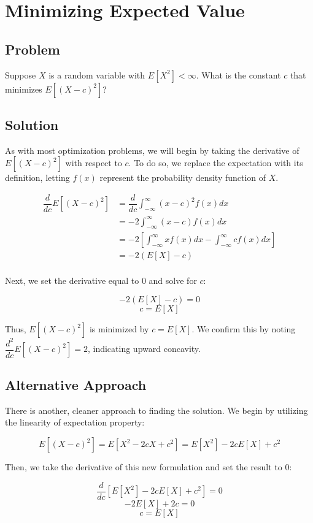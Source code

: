 \documentclass{article}
\date{}
\author{Kaan Aksoy | April 26, 2020}
\title{}
\begin{document}
\maketitle
\section{Minimizing Expected Value}
\subsection{Problem}

Suppose $X$ is a random variable with $E[X^2] < \infty$. What is 
the constant $c$ that minimizes $E[(X - c)^2]$?

\subsection{Solution}

As with most optimization problems, we will begin by taking the 
derivative of $E[(X - c)^2]$ with respect to $c$. To do so, we replace 
the expectation with its definition, letting $f(x)$ represent the 
probability density function of $X$.

\begin{equation*}
\begin{split}
\dfrac{d}{dc}E\left[(X - c)^2\right] &= 
\dfrac{d}{dc} \int_{-\infty}^{\infty} (x-c)^2f(x)dx \\
&= -2\int_{-\infty}^{\infty}(x-c)f(x)dx \\
&= -2\left[ \int_{-\infty}^{\infty}xf(x)dx - 
\int_{-\infty}^{\infty}cf(x)dx \right] \\
&= -2\left( E[X] - c \right) \\
\end{split}
\end{equation*}

Next, we set the derivative equal to $0$ and solve for $c$:

$$ -2\left( E[X] - c \right) = 0$$
$$ c = E[X]$$

Thus, $E[(X - c)^2]$ is minimized by $c = E[X]$. We confirm this by noting 
$\dfrac{d^2}{dc}E[(X - c)^2] = 2$, indicating upward concavity.

\subsection{Alternative Approach}
There is another, cleaner approach to finding the solution. We begin 
by utilizing the linearity of expectation property:

$$E[(X - c)^2] = E[X^2 - 2cX + c^2] = E[X^2] - 2cE[X] +c^2$$

Then, we take the derivative of this new formulation and set the result to $0$:

$$\dfrac{d}{dc} \left[ E[X^2] - 2cE[X] +c^2 \right] = 0$$
$$-2E[X] + 2c = 0$$
$$c = E[X]$$
\end{document}
